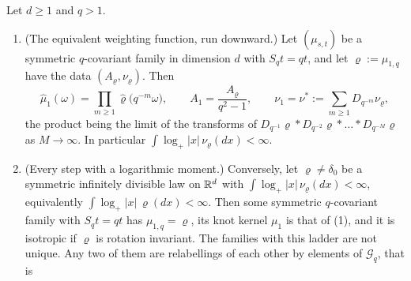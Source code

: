 \begin{proposition}
\label{prop:ladder-knot-kernel}
\leanok
{}
Let $d \ge 1$ and $q > 1$.
\begin{enumerate}
\item (The equivalent weighting function, run downward.) Let $(\mu_{s,t})$ be a symmetric
$q$-covariant family in dimension $d$ with $S_qt = qt$, and let $\varrho := \mu_{1,q}$ have the data
$(A_\varrho, \nu_\varrho)$. Then
\[
  \widehat\mu_1(\omega) = \prod_{m \ge 1}\widehat\varrho\bigl(q^{-m}\omega\bigr), \qquad
  A_1 = \frac{A_\varrho}{q^2 - 1}, \qquad \nu_1 = \nu^* := \sum_{m \ge 1}D_{q^{-m}}\nu_\varrho,
\]
the product being the limit of the transforms of
$D_{q^{-1}}\varrho * D_{q^{-2}}\varrho * \dots * D_{q^{-M}}\varrho$ as $M \to \infty$. In particular
$\int\log_+|x|\,\nu_\varrho(dx) < \infty$.
\item (Every step with a logarithmic moment.) Conversely, let $\varrho \ne \delta_0$ be a symmetric
infinitely divisible law on $\mathbb{R}^d$ with $\int\log_+|x|\,\nu_\varrho(dx) < \infty$, equivalently
$\int\log_+|x|\,\varrho(dx) < \infty$. Then some symmetric $q$-covariant family with $S_qt = qt$ has
$\mu_{1,q} = \varrho$, its knot kernel $\mu_1$ is that of (1), and it is isotropic if $\varrho$ is
rotation invariant. The families with this ladder are not unique.
Any two of them are relabellings of each other by elements of $\mathcal{G}_q$, that is

\end{enumerate}
\end{proposition}
